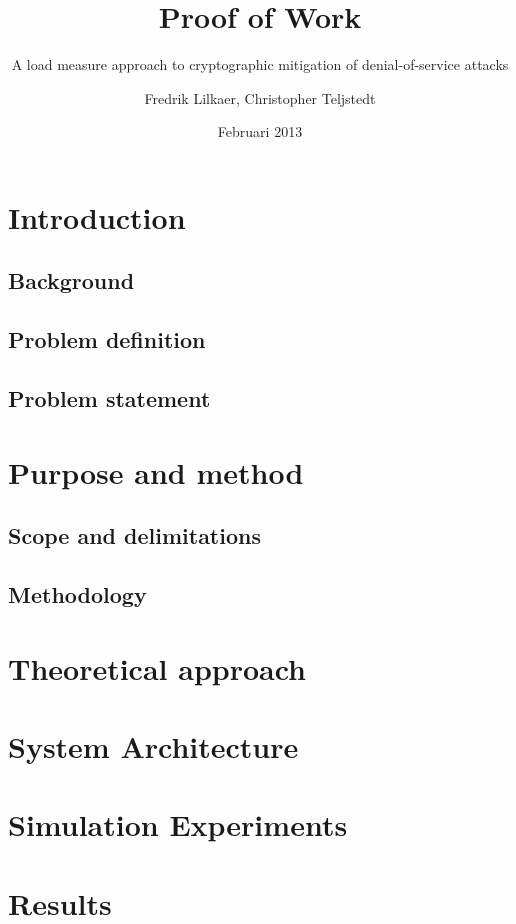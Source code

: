 \documentclass[a4paper,11pt]{kth-mag}
\title{Proof of Work}
\subtitle{A load measure approach to cryptographic mitigation of denial-of-service attacks}
\author{Fredrik Lilkaer, Christopher Teljstedt}
\date{Februari 2013}
\begin{document}
\removepagenumbers
\maketitle
{}
\section{Introduction}

\subsection{Background}

\subsection{Problem definition}

\subsection{Problem statement} %

\section{Purpose and method}

\subsection{Scope and delimitations}

\subsection{Methodology}


\section{Theoretical approach}

\section{System Architecture}

\section{Simulation Experiments}

\section{Results}

\end{document}
